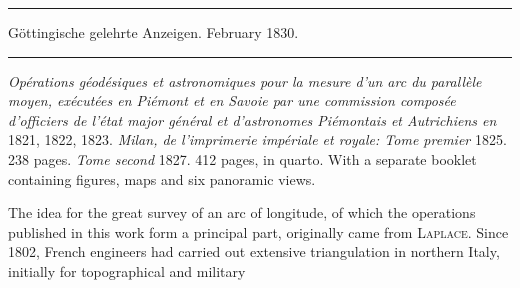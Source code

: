 \begin{center}
\rule{.85\textwidth}{.3pt}\par
Göttingische gelehrte Anzeigen. February 1830.\par
\rule{.85\textwidth}{.3pt}
\end{center}
\hspace*{\parindent}\textit{Opérations géodésiques et astronomiques pour la mesure d’un arc du parallèle moyen, exécutées en Piémont et en Savoie par une commission composée d’officiers de l’état major général et d’astronomes Piémontais et Autrichiens en} 1821, 1822, 1823. \textit{Milan, de l’imprimerie impériale et royale: Tome premier} 1825. 238 pages. \textit{Tome second} 1827. 412 pages, in quarto. With a separate booklet containing figures, maps and six panoramic views.

The idea for the great survey of an arc of longitude, of which the operations published in this work form a principal part, originally came from \textsc{Laplace}. Since 1802, French engineers had carried out extensive triangulation in northern Italy, initially for topographical and military
